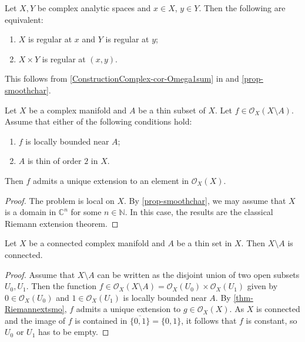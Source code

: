 \begin{proposition}\label{prop-regularlocusproduct}
    Let $X,Y$ be complex analytic spaces and $x\in X$, $y\in Y$. Then the following are equivalent:
    \begin{enumerate}
        \item $X$ is regular at $x$ and $Y$ is regular at $y$;
        \item $X\times Y$ is regular at $(x,y)$.
    \end{enumerate}
\end{proposition}
This follows from \cref{ConstructionComplex-cor-Omega1sum} in  and \cref{prop-smoothchar}.
\iffalse
\begin{proof}
    By \cref{Local-thm-complocalringtest} in \nameref{Local-chap-local},
    \[
        \hat{\mathcal{O}}_{X\times Y,(x,y)}=\hat{\mathcal{O}}_{X,x}\hat{\otimes}\hat{\mathcal{O}}_{Y,y}.  
    \]
    As a noetherian local ring is regular if and only if its completion is by \cite[\href{https://stacks.math.columbia.edu/tag/07NY}{Tag 07NY}]{stacks-project}, it suffices to prove the corresponding algebraic result, which is well-known.
\end{proof}
\fi

\begin{thm}\label{thm-Riemannextsmo}
    Let $X$ be a complex manifold and $A$ be a thin subset of $X$. Let $f\in \mathcal{O}_{X}(X\setminus A)$. Assume that either of the following conditions hold:
    \begin{enumerate}
        \item $f$ is locally bounded near $A$;
        \item $A$ is thin of order $2$ in $X$.
    \end{enumerate}
    Then $f$ admits a unique extension to an element in $\mathcal{O}_X(X)$.
\end{thm}
\begin{proof}
    The problem is local on $X$. By \cref{prop-smoothchar}, we may assume that $X$ is a domain in $\mathbb{C}^n$ for some $n\in \mathbb{N}$. In this case, the results are the classical Riemann extension theorem.
\end{proof}

\begin{corollary}\label{cor-complthininconnectedconn}
    Let $X$ be a connected complex manifold and $A$ be a thin set in $X$. Then $X\setminus A$ is connected.
\end{corollary}
\begin{proof}
    Assume that $X\setminus A$ can be written as the disjoint union of two open subsets $U_0,U_1$. Then the function $f\in \mathcal{O}_X(X\setminus A)=\mathcal{O}_X(U_0)\times \mathcal{O}_X(U_1)$ given by $0\in \mathcal{O}_X(U_0)$ and $1\in \mathcal{O}_X(U_1)$ is locally bounded near $A$. By \cref{thm-Riemannextsmo}, $f$ admits a unique extension to $g\in \mathcal{O}_X(X)$. As $X$ is connected and the image of $f$ is contained in $\overline{\{0,1\}}=\{0,1\}$, it follows that $f$ is constant, so $U_0$ or $U_1$ has to be empty.
\end{proof}

